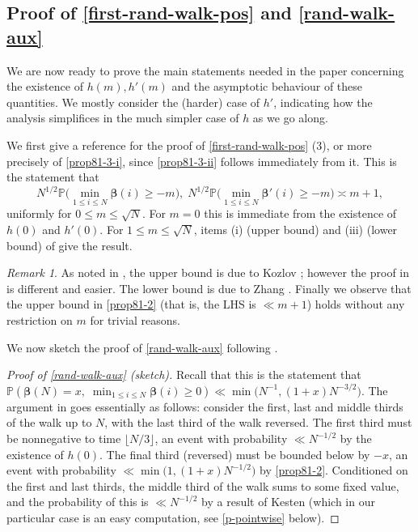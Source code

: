 \documentclass[11pt,reqno]{amsart}
\numberwithin{equation}{section}
\theoremstyle{definition}
\theoremstyle{remark}
\newtheorem*{remark}{Remark}
\newcommand{\mb}{\mathbb}
\def\boldbeta{\boldsymbol\beta}
\renewcommand{\le}{\leqslant}
\renewcommand{\ge}{\geqslant}
\begin{document}
\subsection{Proof of \cref{first-rand-walk-pos} and \cref{rand-walk-aux}} \label{a3-sec} We are now ready to prove the main statements needed in the paper concerning the existence of $h(m), h'(m)$ and the asymptotic behaviour of these quantities. We mostly consider the (harder) case of $h'$, indicating how the analysis simplifices in the much simpler case of $h$ as we go along.

We first give a reference for the proof of \cref{first-rand-walk-pos} (3), or more precisely of \cref{prop81-3-i}, since \cref{prop81-3-ii} follows immediately from it. This is the statement that \begin{equation}\label{prop81-2} N^{1/2} \mb{P}\big(\min_{1 \le i \le N} \boldbeta(i) \ge -m\big), \; N^{1/2} \mb{P}\big(\min_{1 \le i  \le N} \boldbeta'(i) \ge -m\big) \asymp m + 1,\end{equation} uniformly for $0 \le m \le \sqrt{N}$.  For $m = 0$ this is immediate from the existence of $h(0)$ and $h'(0)$. For $1 \le m \le \sqrt{N}$, items (i) (upper bound) and (iii) (lower bound) of \cite[Lemma~3.3]{PP95} give the result. 

\begin{remark} As noted in \cite{PP95}, the upper bound is due to Kozlov \cite[Theorem A, equation (13)]{Koz76}; however the proof in \cite{PP95} is different and easier. The lower bound is due to Zhang \cite[Lemma 1]{zhang}. Finally we observe that the upper bound in \cref{prop81-2} (that is, the LHS is $\ll m + 1$) holds without any restriction on $m$ for trivial reasons.
\end{remark}

We now sketch the proof of \cref{rand-walk-aux} following \cite{addario-berry-reed-2}.

\begin{proof}[Proof of \cref{rand-walk-aux} (sketch)]  Recall that this is the statement that $\mb{P}(\boldbeta(N) = x, \; \min_{1 \le i \le N} \boldbeta(i) \ge 0) \ll \min \big(N^{-1}, (1 + x) N^{-3/2}\big)$. The argument in \cite{addario-berry-reed-2} goes essentially as follows: consider the first, last and middle thirds of the walk up to $N$, with the last third of the walk reversed. The first third must be nonnegative to time $\lfloor N/3\rfloor$, an event with probability $\ll N^{-1/2}$ by the existence of $h(0)$. The final third (reversed) must be bounded below by $-x$, an event with probability $\ll \min \big(1, (1 + x) N^{-1/2}\big)$ by \cref{prop81-2}. Conditioned on the first and last thirds, the middle third of the walk sums to some fixed value, and the probability of this is $\ll N^{-1/2}$ by a result of Kesten (which in our particular case is an easy computation, see \cref{p-pointwise} below). 
\end{proof}
\end{document}
